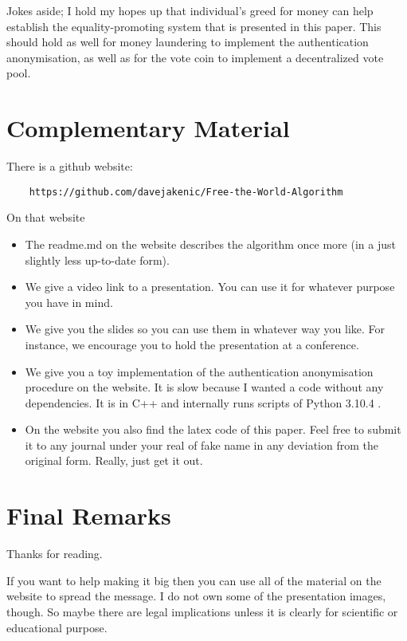 \documentclass{article}
\theoremstyle{definition}
\begin{document}
	Jokes aside; I hold my hopes up that individual's greed for money can help establish the equality-promoting system that is presented in this paper. This should hold as well for money laundering to implement the authentication anonymisation, as well as for the vote coin to implement a decentralized vote pool.
	
	\section{Complementary Material}
	There is a github website:
	\begin{verbatim}
	https://github.com/davejakenic/Free-the-World-Algorithm
	\end{verbatim}
	On that website
	\begin{itemize}
		\item The readme.md on the website describes the algorithm once more (in a just slightly less up-to-date form).
		\item We give a video link to a presentation. You can use it for whatever purpose you have in mind.
		\item We give you the slides so you can use them in whatever way you like. For instance, we encourage you to hold the presentation at a conference.
		\item We give you a toy implementation of the authentication anonymisation procedure on the website. It is slow because I wanted a code without any dependencies. It is in C++ and internally runs scripts of Python 3.10.4 .
		\item On the website you also find the latex code of this paper. Feel free to submit it to any journal under your real of fake name in any deviation from the original form. Really, just get it out.
	\end{itemize}
	
	\section{Final Remarks}
	Thanks for reading. 
	\vspace{3mm}
	
	\noindent
	If you want to help making it big then you can use all of the material on the website to spread the message.
	I do not own some of the presentation images, though. So maybe there are legal implications unless it is clearly for scientific or educational purpose.	
\end{document}
